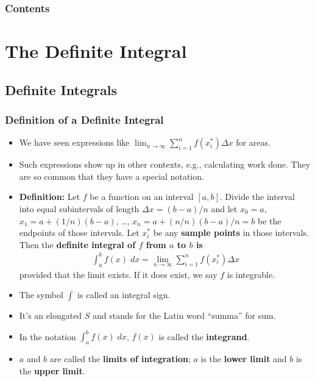 \documentclass[serif,ignorenonframetext]{beamer}
\title{\commonTitleZeroFourTwo}
\subtitle{\commonSubtitleZeroFourTwo}
\author{\commonAuthor}
\institute{\commonInstitute}
\date{\commonDateZeroFourTwo}
\newcommand{\ds}{\displaystyle}
\begin{document}

\begin{frame}
  \titlepage
\end{frame}

\begin{frame}
  \frametitle{Contents}
  \tableofcontents
\end{frame}


\section{The Definite Integral}

\subsection{Definite Integrals}

\begin{frame}
  \frametitle{Definition of a Definite Integral}
  \begin{itemize}[<+->]
  \item We have seen expressions like $\ds \lim_{n\to\infty} \sum_{i=1}^n
    f(x_i^*) \Delta x$ for areas.
  \item Such expressions show up in other contexts, e.g., calculating
    work done.
    They are so common that they have a special notation.
  \item \textbf{Definition:}  Let $f$ be a function on an interval
    $[a,b]$.  Divide
    the interval into equal subintervals of length $\Delta x=(b-a)/n$
    and let $x_0=a$, $x_1=a+(1/n)(b-a)$, \ldots, $x_n=a+(n/n)(b-a)/n=b$
    be the endpoints of those intervals.  Let $x_i^*$ be any \textbf{sample
    points} in those intervals.  Then the \textbf{definite integral of $f$
    from $a$ to $b$ is}
    \begin{align*}
      \int_a^b f(x) \; dx = \lim_{n\to\infty} \sum_{i=1}^n f(x_i^*) \Delta x
    \end{align*}
    provided that the limit exists.  If it does exist, we say $f$ is
    integrable.
  \end{itemize}
\end{frame}

\begin{frame}
  \begin{itemize}[<+->]
  \item The symbol $\int$ is called an integral sign.
  \item It's an elongated $S$ and stands for the Latin word ``summa'' for
    sum.
  \item In the notation $\int_a^b f(x) \; dx$, $f(x)$ is called the
    \textbf{integrand}.
  \item $a$ and $b$ are called the \textbf{limits of integration}; $a$
    is the \textbf{lower limit} and $b$ is the \textbf{upper limit}.
  \end{itemize}
\end{frame}
\end{document}
